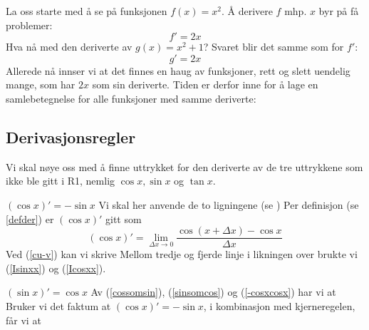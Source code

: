 La oss starte med å se på funksjonen $ {f(x)=x^2}  $.
Å derivere $ f $ mhp. $ x $ byr på få problemer:
\[ f'=2x \]
Hva nå med den deriverte av $ {g(x)=x^2+1} $? Svaret blir det samme som for $ f'$:
\[ g'=2x \]
Allerede nå innser vi at det finnes en haug av funksjoner, rett og slett uendelig mange, som har $ 2x $ som sin deriverte. Tiden er derfor inne for å lage en samlebetegnelse for alle funksjoner med samme deriverte:\regv
\antider
{}
\newpage
{}
\subsection*{Derivasjonsregler}
Vi skal nøye oss med å finne uttrykket for den deriverte av de tre uttrykkene som ikke ble gitt i R1, nemlig $ \cos x, \sin x $ og $ \tan x $.\vsk

{\boldmath $ (\cos x)'=-\sin x $}\bs
Vi skal her anvende de to ligningene (se )
Per definisjon (se \eqref{defder}) er $ (\cos x)' $ gitt som
\[ (\cos x)'= \lim\limits_{\Delta x\to 0}\frac{\cos(x+\Delta x)-\cos x}{\Delta x} \]
Ved (\ref{cu-v}) kan vi skrive
Mellom tredje og fjerde linje i likningen over brukte vi (\ref{Isinxx}) og (\ref{Icosxx}). \vsk

{\boldmath $ (\sin x)'=\cos x $}\bs
Av (\ref{cossomsin}), (\ref{sinsomcos}) og (\ref{-cosxcosx}) har vi at
Bruker vi det faktum at $ (\cos x)'=-\sin x $, i kombinasjon med kjerneregelen, får vi at
\vsk

